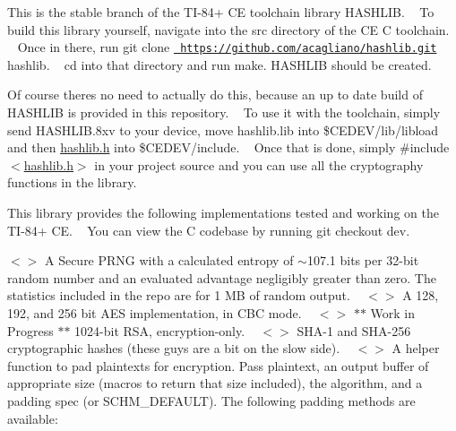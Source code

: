 This is the stable branch of the TI-\/84+ CE toolchain library HASHLIB. ~\newline
 To build this library yourself, navigate into the {\ttfamily src} directory of the CE C toolchain. ~\newline
 Once in there, run {\ttfamily git clone \href{https://github.com/acagliano/hashlib.git}{\texttt{ https\+://github.\+com/acagliano/hashlib.\+git}} hashlib}. ~\newline
 cd into that directory and run {\ttfamily make}. HASHLIB should be created. ~\newline


Of course there\textquotesingle{}s no need to actually do this, because an up to date build of HASHLIB is provided in this repository. ~\newline
 To use it with the toolchain, simply send {\ttfamily HASHLIB.\+8xv} to your device, move {\ttfamily hashlib.\+lib} into {\ttfamily \$\+CEDEV/lib/libload} and then {\ttfamily \mbox{\hyperlink{hashlib_8h}{hashlib.\+h}}} into {\ttfamily \$\+CEDEV/include}. ~\newline
 Once that is done, simply {\ttfamily \#include $<$\mbox{\hyperlink{hashlib_8h}{hashlib.\+h}}$>$} in your project source and you can use all the cryptography functions in the library. ~\newline


This library provides the following implementations tested and working on the TI-\/84+ CE. ~\newline
 You can view the C codebase by running {\ttfamily git checkout dev}. ~\newline


$<$$>$ A Secure PRNG with a calculated entropy of $\sim$107.1 bits per 32-\/bit random number and an evaluated advantage negligibly greater than zero. The statistics included in the repo are for 1 MB of random output. ~\newline
 $<$$>$ A 128, 192, and 256 bit AES implementation, in CBC mode. ~\newline
 $<$$>$ $\ast$$\ast$ Work in Progress $\ast$$\ast$ 1024-\/bit RSA, encryption-\/only. ~\newline
 $<$$>$ SHA-\/1 and SHA-\/256 cryptographic hashes (these guys are a bit on the slow side). ~\newline
 $<$$>$ A helper function to pad plaintexts for encryption. Pass plaintext, an output buffer of appropriate size (macros to return that size included), the algorithm, and a padding spec (or SCHM\+\_\+\+DEFAULT). The following padding methods are available\+: ~\newline

